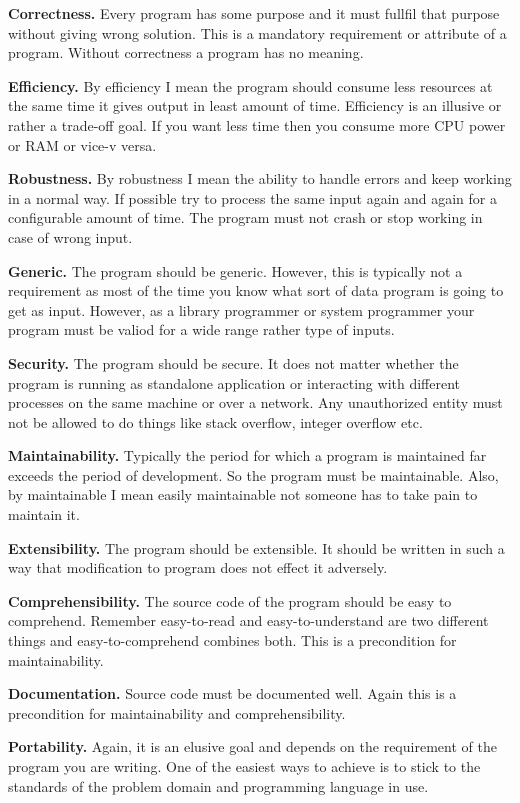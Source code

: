 \startitemize[n]
\item {\bf Correctness.} Every program has some purpose and it must fullfil that
purpose without giving wrong solution. This is a mandatory requirement or
attribute of a program. Without correctness a program has no meaning.
\item {\bf Efficiency.} By efficiency I mean the program should consume less
resources at the same time it gives output in least amount of time. Efficiency
is an illusive or rather a trade-off goal. If you want less time then you consume
more CPU power or RAM or vice-v versa.
\item {\bf Robustness.} By robustness I mean the ability to handle errors and
keep working in a normal way. If possible try to process the same input again
and again for a configurable amount of time. The program must not crash or stop
working in case of wrong input.
\item{\bf Generic.} The program should be generic. However, this is typically
not a requirement as most of the time you know what sort of data program is
going to get as input. However, as a library programmer or system programmer
your program must be valiod for a wide range rather type of inputs.
\item{\bf Security.} The program should be secure. It does not matter whether
the program is running as standalone application or interacting with different
processes on the same machine or over a network. Any unauthorized entity must
not be allowed to do things like stack overflow, integer overflow etc.
\item{\bf Maintainability.} Typically the period for which a program is maintained
far exceeds the period of development. So the program must be maintainable.
Also, by maintainable I mean easily maintainable not someone has to take pain
to maintain it.
\item{\bf Extensibility.} The program should be extensible. It should be written
in such a way that modification to program does not effect it adversely.
\item{\bf Comprehensibility.} The source code of the program should be easy to
comprehend. Remember easy-to-read and easy-to-understand are two different
things and easy-to-comprehend combines both. This is a precondition for
maintainability.
\item{\bf Documentation.} Source code must be documented well. Again this is a
precondition for maintainability and comprehensibility.
\item{\bf Portability.} Again, it is an elusive goal and depends on the
requirement of the program you are writing. One of the easiest ways to achieve
is to stick to the standards of the problem domain and programming language
in use.
\stopitemize

